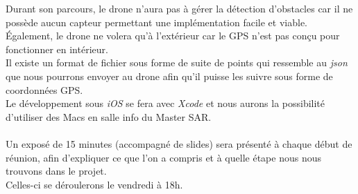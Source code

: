 \documentclass[]{article}
\begin{document}
Durant son parcours, le drone n'aura pas à gérer la détection d'obstacles car il ne possède aucun capteur permettant une implémentation facile et viable. \\
Également, le drone ne volera  qu'à l'extérieur car le GPS n'est pas conçu pour fonctionner en intérieur.\\
Il existe un format de fichier sous forme de suite de points qui ressemble au \textit{json} que nous pourrons envoyer au drone afin qu'il puisse les suivre sous forme de coordonnées GPS.\\
Le développement sous \textit{iOS} se fera avec \textit{Xcode} et nous aurons la possibilité d'utiliser des Macs en salle info du Master SAR.\\
\\

Un exposé de 15 minutes (accompagné de slides) sera présenté à chaque début de réunion, afin d'expliquer ce que l'on a compris et à quelle étape nous nous trouvons dans le projet.\\
Celles-ci se déroulerons le vendredi à 18h.
\end{document}
